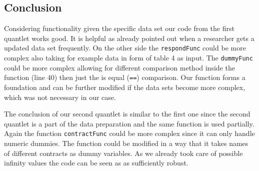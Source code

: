 \subsection{Conclusion}
Considering functionality given the specific data set our code from the first quantlet works good. It is helpful as already pointed out when a researcher gets a updated data set frequently. On the other side the \texttt{respondFunc} could be more complex also taking for example data in form of table 4 as input. The \texttt{dummyFunc} could be more complex allowing for different comparison method inside the function (line 40) then just the is equal (\texttt{==}) comparison. Our function forms a foundation and can be further modified if the data sets become more complex, which was not necessary in our case.

The conclusion of our second quantlet is similar to the first one since the second quantlet is a part of the data preparation and the same function is used partially. Again the function \texttt{contractFunc} could be more complex since it can only handle numeric dummies. The function could be modified in a way that it takes names of different contracts as dummy variables. As we already took care of possible infinity values the code can be seen as as sufficiently robust.